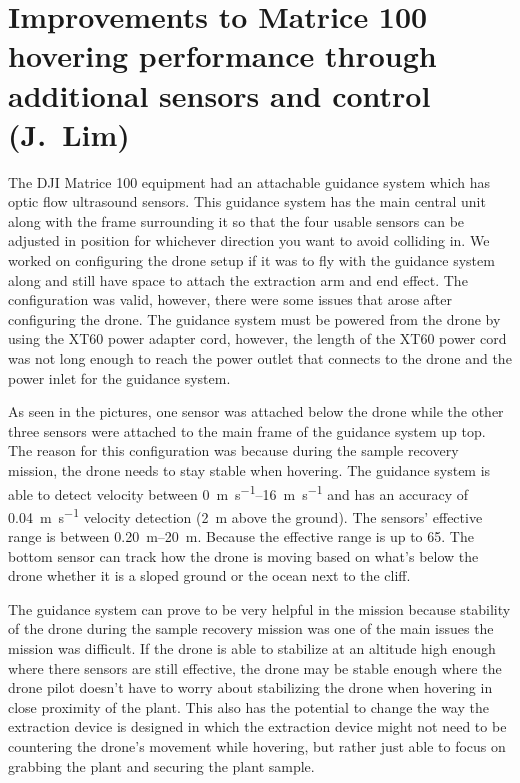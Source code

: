 \section{Improvements to Matrice 100 hovering performance through additional sensors and control (J.~Lim)}
\label{sec:hoveringcontrol}

The DJI Matrice 100 equipment had an attachable guidance system which has optic flow ultrasound sensors. This guidance system has the main central unit along with the frame surrounding it so that the four usable sensors can be adjusted in position for whichever direction you want to avoid colliding in. We worked on configuring the drone setup if it was to fly with the guidance system along and still have space to attach the extraction arm and end effect. The configuration was valid, however, there were some issues that arose after configuring the drone. The guidance system must be powered from the drone by using the XT60 power adapter cord, however, the length of the XT60 power cord was not long enough to reach the power outlet that connects to the drone and the power inlet for the guidance system. 

As seen in the pictures, one sensor was attached below the drone while the other three sensors were attached to the main frame of the guidance system up top. The reason for this configuration was because during the sample recovery mission, the drone needs to stay stable when hovering. The guidance system is able to detect velocity between \SIrange{0}{16}{\meter\per\second} and has an accuracy of \SI{0.04}{\meter\per\second} velocity detection (\SI{2}{\meter} above the ground). The sensors’ effective range is between \SIrange{0.20}{20}{\meter}. Because the effective range is up to \SI{65}{\foot}. The bottom sensor can track how the drone is moving based on what’s below the drone whether it is a sloped ground or the ocean next to the cliff. 

The guidance system can prove to be very helpful in the mission because stability of the drone during the sample recovery mission was one of the main issues the mission was difficult. If the drone is able to stabilize at an altitude high enough where there sensors are still effective, the drone may be stable enough where the drone pilot doesn’t have to worry about stabilizing the drone when hovering in close proximity of the plant. This also has the potential to change the way the extraction device is designed in which the extraction device might not need to be countering the drone’s movement while hovering, but rather just able to focus on grabbing the plant and securing the plant sample. 

